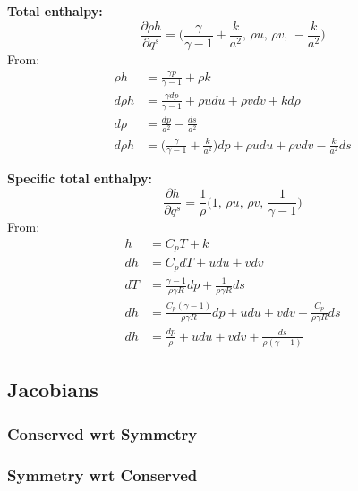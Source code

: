 \documentclass{article}
\begin{document}
\textbf{Total enthalpy:}
\begin{equation*}
    \frac{\partial \rho h}{\partial q^s} = \big( \frac{\gamma}{\gamma-1} + \frac{k}{a^2},\, \rho u,\, \rho v,\, -\frac{k}{a^2} \big)
\end{equation*}
From:
\begin{equation*}
    \begin{split}
        \rho h  & = \frac{\gamma p}{\gamma-1} + \rho k \\
        d\rho h & = \frac{\gamma dp}{\gamma-1} + \rho u du + \rho v dv + kd\rho \\
        d\rho   & = \frac{dp}{a^2} - \frac{ds}{a^2} \\
        d\rho h & = \big(\frac{\gamma}{\gamma-1} + \frac{k}{a^2}\big)dp + \rho u du + \rho v dv - \frac{k}{a^2}ds
    \end{split}
\end{equation*}

\textbf{Specific total enthalpy:}
\begin{equation*}
    \frac{\partial h}{\partial q^s} = \frac{1}{\rho} \big( 1,\, \rho u,\, \rho v,\, \frac{1}{\gamma-1} \big)
\end{equation*}
From:
\begin{equation*}
    \begin{split}
        h  & = C_p T + k \\
        dh & = C_p dT + udu + vdv \\
        dT & = \frac{\gamma-1}{\rho \gamma R}dp + \frac{1}{\rho \gamma R}ds \\
        dh & = \frac{C_p (\gamma-1)}{\rho \gamma R}dp + udu + vdv + \frac{C_p}{\rho \gamma R}ds \\
        dh & = \frac{dp}{\rho} + udu + vdv + \frac{ds}{\rho(\gamma-1)}
    \end{split}
\end{equation*}


\subsection{Jacobians}


\subsubsection{Conserved wrt Symmetry}


\subsubsection{Symmetry wrt Conserved}
\end{document}
